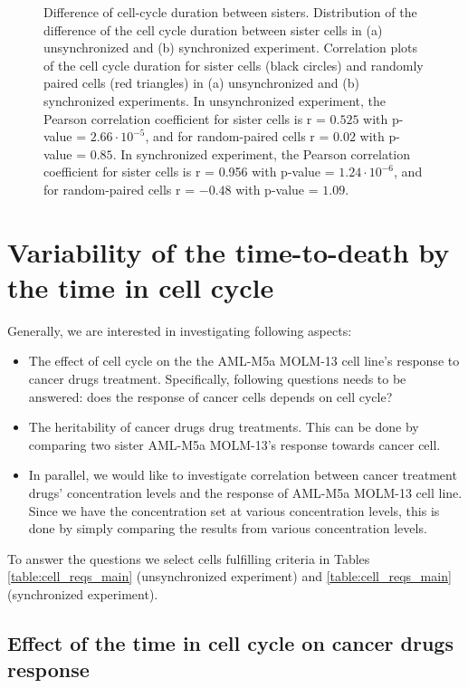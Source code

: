 \documentclass[pdftex,12pt,a4paper]{report}
\begin{document}
\begin{figure}[H]
\caption[Difference of cell-cycle duration between sisters]{Difference of cell-cycle duration between sisters. Distribution of the difference of the cell cycle duration between sister cells in (a) unsynchronized and (b) synchronized experiment. Correlation plots of the cell cycle duration for sister cells (black circles) and randomly paired cells (red  triangles) in (a) unsynchronized and (b) synchronized experiments. In unsynchronized experiment, the Pearson correlation coefficient for sister cells is r = $0.525$ with p-value = $2.66 \cdot 10^{-5}$, and for random-paired cells r = $0.02$ with p-value = $0.85$.  In synchronized experiment, the Pearson correlation coefficient for sister cells is r = 0.956 with p-value = $1.24 \cdot 10^{-6}$, and for random-paired cells r = $-0.48$ with p-value = $1.09$.}
\label{fig:ccd_diff_all}
\end{figure}

\section{Variability of the time-to-death by the time in cell cycle}
\label{section:ttd_tic_sisters}

Generally, we are interested in investigating following aspects:

\begin{itemize}
\item The effect of cell cycle on the the AML-M5a MOLM-13 cell line's response to cancer drugs treatment. Specifically, following questions needs to be answered: does the response of cancer cells depends on cell cycle?

\item The heritability of cancer drugs drug treatments. This can be done by comparing two sister AML-M5a MOLM-13's response towards cancer cell.

\item In parallel, we would like to investigate correlation between cancer treatment drugs' concentration levels and the response of AML-M5a MOLM-13 cell line. Since we have the concentration set at various concentration levels, this is done by simply comparing the results from various concentration levels.
\end{itemize}

To answer the questions we select cells fulfilling criteria in Tables \ref{table:cell_reqs_main} (unsynchronized experiment) and \ref{table:cell_reqs_main} (synchronized experiment).

\subsection{Effect of the time in cell cycle on cancer drugs response}
\end{document}
